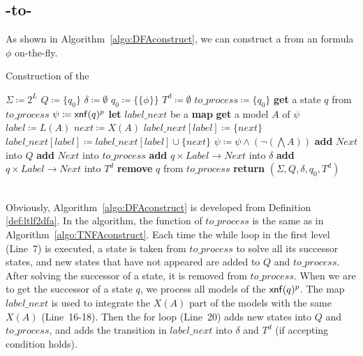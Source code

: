 \subsection{\ltlf-to-\TDFA}
As shown in Algorithm~\ref{algo:DFAconstruct}, we can construct a \TDFA from an \ltlf formula $\phi$ on-the-fly.

\begin{algorithm}[H]\label{algo:DFAconstruct}
  \caption{Construction of the \TDFA}
  \LinesNumbered
  $\Sigma\coloneqq 2^L$\;
  $Q\coloneqq\{q_0\}$\;
  $\delta\coloneqq\emptyset$\;
  $q_0\coloneqq\{\{\phi\}\}$\;
  $T^d\coloneqq\emptyset$\;
  $to\_process\coloneqq\{q_0\}$\;
  {
    \textbf{get} a state $q$ from $to\_process$\;
    $\psi\coloneqq{\sf xnf}(q)^p$\;
    \textbf{let}  $label\_next$ be a \textbf{map}\;
    {
      \textbf{get} a model $A$ of $\psi$\;
      $label\coloneqq L(A)$\;
      $next\coloneqq X(A)$\;
      {
        $label\_next[label]\coloneqq \{next\}$\;
      }
      \Else
      {
        $label\_next[label]\coloneqq label\_next[label]\cup\{next\}$\;
      }
      $\psi\coloneqq \psi\land(\neg(\bigwedge A))$\;
    }
    {
      {
        \textbf{add} $Next$ into $Q$\;
        \textbf{add} $Next$ into $to\_process$\;
      }
      \textbf{add} $q\times Label\to Next$ into $\delta$\;
      {
        \textbf{add} $q\times Label\to Next$ into $T^d$\;
      }
    }
    \textbf{remove} $q$ from $to\_process$\;
  }
  \textbf{return} $(\Sigma,Q,\delta,q_0,T^d)$\;
\end{algorithm}
~\\
Obviously, Algorithm~\ref{algo:DFAconstruct} is developed from Definition \ref{def:ltlf2dfa}. In the algorithm, the function of $to\_process$ is the same as in Algorithm~\ref{algo:TNFAconstruct}. Each time the while loop in the first level (Line~7) is executed, a state is taken from $to\_process$ to solve all its successor states, and new states that have not appeared are added to $Q$ and $to\_process$. After solving the successor of a state, it is removed from $to\_process$. When we are to get the successor of a state $q$, we process all models of the ${\sf xnf}(q)^p$. The map $label\_next$ is used to integrate the $X(A)$ part of the models with the same $X(A)$ (Line~16-18). Then the for loop (Line~20) adds new states into $Q$ and $to\_process$, and adds the transition in $label\_next$ into $\delta$ and $T^d$ (if accepting condition holds).
